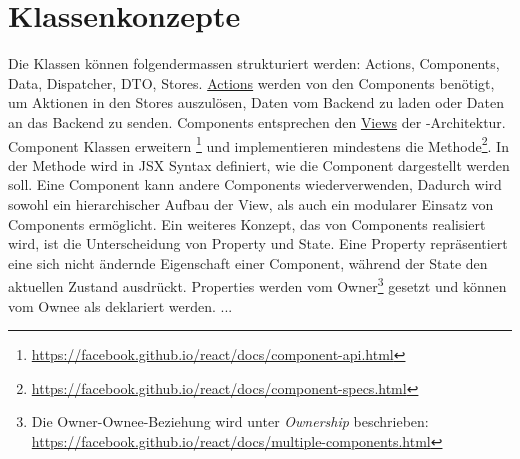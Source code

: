 \section{Klassenkonzepte}
\label{pd-klassenkonzepte}
Die Klassen können folgendermassen strukturiert werden: Actions, Components, Data, Dispatcher, DTO, Stores.\newline
\newline
\hyperref[pd-flux-actions]{Actions} werden von den Components benötigt, um Aktionen in den Stores auszulösen, Daten vom \gls{Backend} zu laden oder Daten an das \gls{Backend} zu senden.\newline
\newline
Components entsprechen den \hyperref[pd-flux-views]{Views} der -Architektur.
Component Klassen erweitern \footnote{\url{https://facebook.github.io/react/docs/component-api.html}} und implementieren mindestens die  Methode\footnote{\url{https://facebook.github.io/react/docs/component-specs.html}}. 
In der  Methode wird in \gls{JSX} Syntax definiert, wie die Component dargestellt werden soll.\newline
Eine Component kann andere Components wiederverwenden,
Dadurch wird sowohl ein hierarchischer Aufbau der View, als auch ein modularer Einsatz von Components  ermöglicht.\newline
Ein weiteres Konzept, das von Components realisiert wird, ist die Unterscheidung von Property und State.
Eine Property repräsentiert eine sich nicht ändernde Eigenschaft einer Component, während der State den aktuellen Zustand ausdrückt.
Properties werden vom Owner\footnote{Die Owner-Ownee-Beziehung wird unter \emph{Ownership} beschrieben: \url{https://facebook.github.io/react/docs/multiple-components.html}} gesetzt und können vom Ownee als  deklariert werden.
...